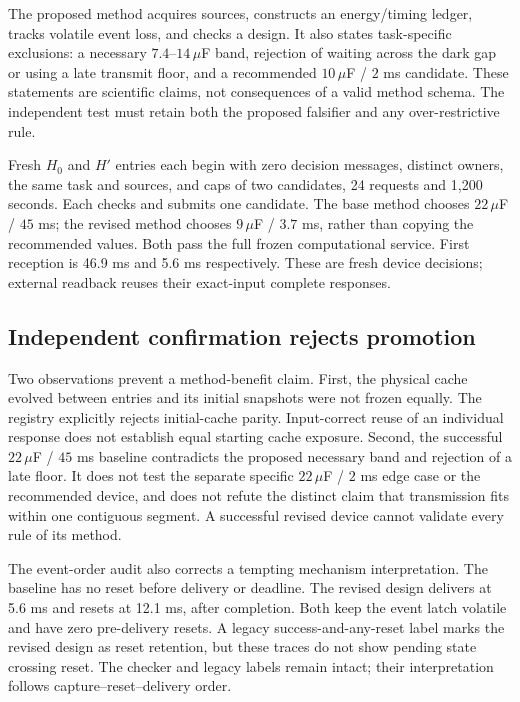 The proposed method acquires sources, constructs an energy/timing ledger,
tracks volatile event loss, and checks a design. It also states task-specific
exclusions: a necessary $7.4$--$14\,\mu$F band, rejection of waiting across the
dark gap or using a late transmit floor, and a recommended
$10\,\mu$F / $2$ ms candidate. These statements are scientific claims, not
consequences of a valid method schema. The independent test must retain both
the proposed falsifier and any over-restrictive rule.

Fresh $H_0$ and $H'$ entries each begin with zero decision messages, distinct
owners, the same task and sources, and caps of two candidates, 24 requests and
1,200 seconds. Each checks and submits one candidate. The base method chooses
$22\,\mu$F / $45$ ms; the revised method chooses $9\,\mu$F / $3.7$ ms, rather
than copying the recommended values. Both pass the full frozen computational
service. First reception is 46.9 ms and 5.6 ms respectively. These are fresh
device decisions; external readback reuses their exact-input complete responses.

\subsection{Independent confirmation rejects promotion}
Two observations prevent a method-benefit claim. First, the physical cache
evolved between entries and its initial snapshots were not frozen equally.
The registry explicitly rejects initial-cache parity. Input-correct reuse of
an individual response does not establish equal starting cache exposure.
Second, the successful $22\,\mu$F / $45$ ms baseline contradicts the proposed
necessary band and rejection of a late floor. It does not test the separate
specific $22\,\mu$F / $2$ ms edge case or the recommended device, and does not
refute the distinct claim that transmission fits within one contiguous segment.
A successful revised device cannot validate every rule of its method.

The event-order audit also corrects a tempting mechanism interpretation. The
baseline has no reset before delivery or deadline. The revised design delivers
at 5.6 ms and resets at 12.1 ms, after completion. Both keep the event latch
volatile and have zero pre-delivery resets. A legacy success-and-any-reset label
marks the revised design as reset retention, but these traces do not show pending
state crossing reset. The checker and legacy labels remain intact; their
interpretation follows capture--reset--delivery order.

